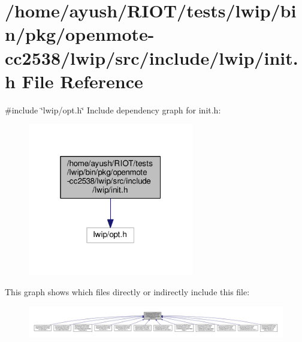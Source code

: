 \hypertarget{openmote-cc2538_2lwip_2src_2include_2lwip_2init_8h}{}\section{/home/ayush/\+R\+I\+O\+T/tests/lwip/bin/pkg/openmote-\/cc2538/lwip/src/include/lwip/init.h File Reference}
\label{openmote-cc2538_2lwip_2src_2include_2lwip_2init_8h}
{\ttfamily \#include \char`\"{}lwip/opt.\+h\char`\"{}}\newline
Include dependency graph for init.\+h\+:
\nopagebreak
\begin{figure}[H]
\begin{center}
\leavevmode
\includegraphics[width=205pt]{openmote-cc2538_2lwip_2src_2include_2lwip_2init_8h__incl}
\end{center}
\end{figure}
This graph shows which files directly or indirectly include this file\+:
\nopagebreak
\begin{figure}[H]
\begin{center}
\leavevmode
\includegraphics[width=350pt]{openmote-cc2538_2lwip_2src_2include_2lwip_2init_8h__dep__incl}
\end{center}
\end{figure}
